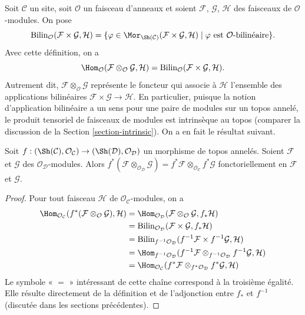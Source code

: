 \noindent
Soit $\mathcal{C}$ un site, soit $\mathcal{O}$ un faisceau d'anneaux et soient
$\mathcal{F}$, $\mathcal{G}$, $\mathcal{H}$ des faisceaux de
$\mathcal{O}$-modules. On pose
$$
\text{Bilin}_\mathcal{O}(\mathcal{F} \times \mathcal{G}, \mathcal{H})
=
\{\varphi \in
\Mor_{\Sh(\mathcal{C})}(
\mathcal{F} \times \mathcal{G}, \mathcal{H}) \mid
\varphi \text{ est }\mathcal{O}\text{-bilinéaire}\}.
$$
Avec cette définition, on a
$$
\Hom_\mathcal{O}
(\mathcal{F} \otimes_\mathcal{O} \mathcal{G}, \mathcal{H})
=
\text{Bilin}_\mathcal{O}(\mathcal{F} \times \mathcal{G}, \mathcal{H}).
$$
Autrement dit, $\mathcal{F} \otimes_\mathcal{O} \mathcal{G}$ représente le
foncteur qui associe à $\mathcal{H}$ l'ensemble des applications bilinéaires
$\mathcal{F} \times \mathcal{G} \to \mathcal{H}$.
En particulier, puisque la notion d'application bilinéaire a un sens pour
une paire de modules sur un topos annelé, le produit tensoriel de faisceaux de
modules est intrinsèque au topos (comparer la discussion de la
Section \ref{section-intrinsic}). On a en fait le résultat suivant.

\begin{lemma}
\label{lemma-tensor-product-pullback}
Soit $f : (\Sh(\mathcal{C}), \mathcal{O}_\mathcal{C})
\to (\Sh(\mathcal{D}), \mathcal{O}_\mathcal{D})$ un morphisme de topos
annelés. Soient $\mathcal{F}$ et $\mathcal{G}$ des
$\mathcal{O}_\mathcal{D}$-modules. Alors
$f^*(\mathcal{F} \otimes_{\mathcal{O}_\mathcal{D}} \mathcal{G})
= f^*\mathcal{F} \otimes_{\mathcal{O}_\mathcal{C}} f^*\mathcal{G}$
fonctoriellement en $\mathcal{F}$ et $\mathcal{G}$.
\end{lemma}

\begin{proof}
Pour tout faisceau $\mathcal{H}$ de $\mathcal{O}_\mathcal{C}$-modules, on a
\begin{align*}
\Hom_{\mathcal{O}_\mathcal{C}}(
f^*(\mathcal{F} \otimes_\mathcal{O} \mathcal{G}), \mathcal{H})
& =
\Hom_{\mathcal{O}_\mathcal{D}}(
\mathcal{F} \otimes_\mathcal{O} \mathcal{G}, f_*\mathcal{H}) \\
& =
\text{Bilin}_{\mathcal{O}_\mathcal{D}}(
\mathcal{F} \times \mathcal{G}, f_*\mathcal{H}) \\
& =
\text{Bilin}_{f^{-1}\mathcal{O}_\mathcal{D}}(
f^{-1}\mathcal{F} \times f^{-1}\mathcal{G}, \mathcal{H}) \\
& =
\Hom_{f^{-1}\mathcal{O}_\mathcal{D}}(
f^{-1}\mathcal{F} \otimes_{f^{-1}\mathcal{O}_\mathcal{D}} f^{-1}\mathcal{G},
\mathcal{H}) \\
& =
\Hom_{\mathcal{O}_\mathcal{C}}(
f^*\mathcal{F} \otimes_{f^*\mathcal{O}_\mathcal{D}} f^*\mathcal{G},
\mathcal{H})
\end{align*}
Le symbole « $=$ » intéressant de cette chaîne correspond à la
troisième égalité. Elle résulte
directement de la définition et de l'adjonction entre $f_*$ et $f^{-1}$
(discutée dans les sections précédentes).
\end{proof}

